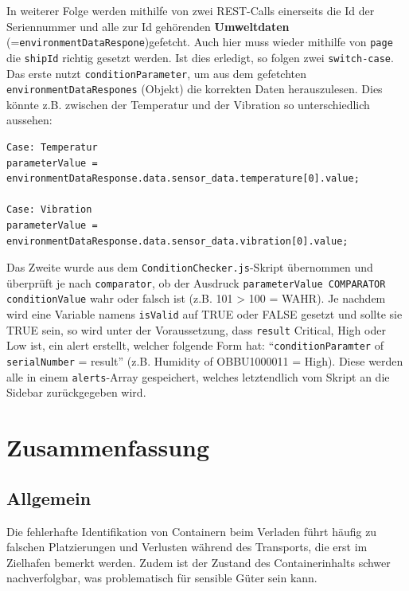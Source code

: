 \documentclass[
    headings=optiontotocandhead,%
    twoside,
    numbers=noenddot,%
    12pt, %
    titlepage, %
    parskip=full, %
    listof=leveldown, 
    numbers=noenddot, %
    a4paper,DIV=14,
    BCOR=15mm,
]{scrbook}
\makeatletter
\newcommand{\passthrough}[1]{#1}
\newcommand*{\the@orig@section}{}
\let\the@orig@section\section
\renewcommand*{\section}{%
  \clearpage
  \the@orig@section
}
\makeatother
\begin{document}
In weiterer Folge werden mithilfe von zwei REST-Calls einerseits die Id
der Seriennummer und alle zur Id gehörenden \textbf{Umweltdaten}
(=\passthrough{\lstinline!environmentDataRespone!})gefetcht. Auch hier
muss wieder mithilfe von \passthrough{\lstinline!page!} die
\passthrough{\lstinline!shipId!} richtig gesetzt werden. Ist dies
erledigt, so folgen zwei \passthrough{\lstinline!switch-case!}. Das
erste nutzt \passthrough{\lstinline!conditionParameter!}, um aus dem
gefetchten \passthrough{\lstinline!environmentDataRespones!} (Objekt)
die korrekten Daten herauszulesen. Dies könnte z.B. zwischen der
Temperatur und der Vibration so unterschiedlich aussehen:

\begin{lstlisting}[caption={Umweltdaten korrekt aus gefetchten Objekt lesen}]
Case: Temperatur
parameterValue = environmentDataResponse.data.sensor_data.temperature[0].value;

Case: Vibration
parameterValue = environmentDataResponse.data.sensor_data.vibration[0].value;
\end{lstlisting}

Das Zweite wurde aus dem
\passthrough{\lstinline!ConditionChecker.js!}-Skript übernommen und
überprüft je nach \passthrough{\lstinline!comparator!}, ob der Ausdruck
\passthrough{\lstinline!parameterValue COMPARATOR conditionValue!} wahr
oder falsch ist (z.B. 101 \textgreater{} 100 = WAHR). Je nachdem wird
eine Variable namens \passthrough{\lstinline!isValid!} auf TRUE oder
FALSE gesetzt und sollte sie TRUE sein, so wird unter der Voraussetzung,
dass \passthrough{\lstinline!result!} Critical, High oder Low ist, ein
alert erstellt, welcher folgende Form hat:
``\passthrough{\lstinline!conditionParamter!} of
\passthrough{\lstinline!serialNumber!} = result'' (z.B. Humidity of
OBBU1000011 = High). Diese werden alle in einem
\passthrough{\lstinline!alerts!}-Array gespeichert, welches letztendlich
vom Skript an die Sidebar zurückgegeben wird.

\hypertarget{zusammenfassung}{%
\section{Zusammenfassung}\label{zusammenfassung}}

\hypertarget{allgemein}{%
\subsection{Allgemein}\label{allgemein}}

Die fehlerhafte Identifikation von Containern beim Verladen führt häufig
zu falschen Platzierungen und Verlusten während des Transports, die erst
im Zielhafen bemerkt werden. Zudem ist der Zustand des Containerinhalts
schwer nachverfolgbar, was problematisch für sensible Güter sein kann.
\end{document}
